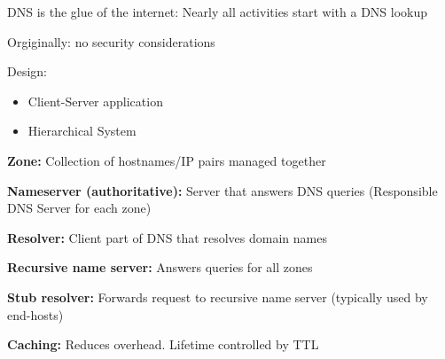 \documentclass[fs, footer]{latex4ei}
\begin{document}
\begin{multicols*}{4}
{DNS is the glue of the internet: Nearly all activities start with a DNS lookup

Orgiginally: no security considerations

Design:	
\begin{itemize}
	\item Client-Server application
	\item Hierarchical System
\end{itemize}

\textbf{Zone:} Collection of hostnames/IP pairs managed together

\textbf{Nameserver (authoritative): } Server that answers DNS queries (Responsible DNS Server for each zone)

\textbf{Resolver:} Client part of DNS that resolves domain names

\textbf{Recursive name server:}  Answers queries for all zones

\textbf{Stub resolver:} Forwards request to recursive name server (typically used by end-hosts)

\textbf{Caching:} Reduces overhead. Lifetime controlled by TTL 
}
\end{multicols*}
\end{document}
